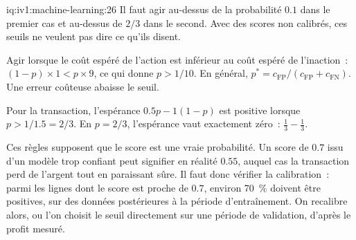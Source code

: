 \begin{solution}{iq:iv1:machine-learning:26}
Il faut agir au-dessus de la probabilité $0.1$ dans le premier cas et au-dessus de $2/3$ dans le second. Avec des scores non calibrés, ces seuils ne veulent pas dire ce qu'ils disent.

Agir lorsque le coût espéré de l'action est inférieur au coût espéré de l'inaction~: $(1 - p) \times 1 < p \times 9$, ce qui donne $p > 1/10$. En général, $p^* = c_{\text{FP}}/(c_{\text{FP}} + c_{\text{FN}})$. Une erreur coûteuse abaisse le seuil.

Pour la transaction, l'espérance $0.5p - 1(1 - p)$ est positive lorsque $p > 1/1.5 = 2/3$. En $p = 2/3$, l'espérance vaut exactement zéro~: $\frac13 - \frac13$.

Ces règles supposent que le score est une vraie probabilité. Un score de $0.7$ issu d'un modèle trop confiant peut signifier en réalité $0.55$, auquel cas la transaction perd de l'argent tout en paraissant sûre. Il faut donc vérifier la calibration~: parmi les lignes dont le score est proche de $0.7$, environ 70~\% doivent être positives, sur des données postérieures à la période d'entraînement. On recalibre alors, ou l'on choisit le seuil directement sur une période de validation, d'après le profit mesuré.



\end{solution}

